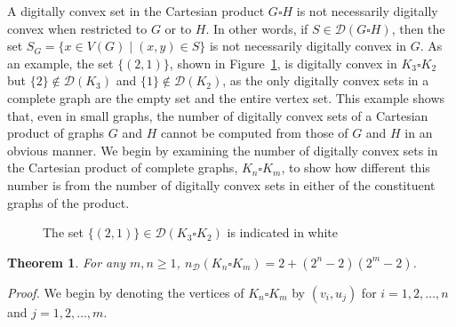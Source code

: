 \documentclass[12pt]{article}
\newtheorem{thm}{Theorem}[section]
\begin{document}
A digitally convex set in the Cartesian product $G\square H$ is not necessarily digitally convex when restricted to $G$ or to $H$. In other words, if $S\in \mathscr{D}(G\square H)$, then the set $S_G = \{x\in V(G) \mid (x,y)\in S\}$ is not necessarily digitally convex in $G$. As an example, the set $\{(2,1)\}$, shown in Figure~\ref{fig:k3k2}, is digitally convex in $K_3 \square K_2$ but $\{2\}\not\in\mathscr{D}(K_3)$ and $\{1\}\not\in\mathscr{D}(K_2)$, as the only digitally convex sets in a complete graph are the empty set and the entire vertex set. This example shows that, even in small graphs, the number of digitally convex sets of a Cartesian product of graphs $G$ and $H$ cannot be computed from those of $G$ and $H$ in an obvious manner. We begin by examining the number of digitally convex sets in the Cartesian product of complete graphs, $K_n \square K_m$, to show how different this number is from the number of digitally convex sets in either of the constituent graphs of the product. 

\begin{figure}[ht]
\centering
{}

\caption{The set $\{(2,1)\}\in \mathscr{D}(K_3 \square K_2)$ is indicated in white}
\label{fig:k3k2}
\end{figure}

\begin{thm}
For any $m,n\geq 1$, $n_\mathscr{D}(K_n \square K_m) = 2+(2^n-2)(2^m-2)$.
\end{thm}

\noindent
\emph{Proof.} We begin by denoting the vertices of $K_n \square K_m$ by $(v_i,u_j)$ for $i=1,2,\dots,n$ and $j=1,2,\dots,m$. 
\end{document}
